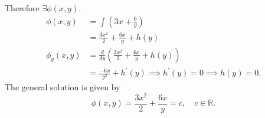 \documentclass[
	12pt,
	]{article}
\newcommand{\R}{\mathbb{R}}
\theoremstyle{definition}
\theoremstyle{definition}
\theoremstyle{definition}
\theoremstyle{definition}
\theoremstyle{definition}
\theoremstyle{example}
\theoremstyle{note}
\theoremstyle{remark}
\theoremstyle{example}
\begin{document}
			Therefore $\exists \phi(x,y)$. 
			\begin{align*}
				\phi(x,y) &= \int \left(3x + \frac{6}{y}\right) \\
				&= \frac{3x^{2}}{2} + \frac{6x}{y} + h(y) \\
				\phi_{y}(x,y) &= \frac{d}{dy} \left(\frac{3x^{2}}{2} + \frac{6x}{y} + h(y)\right) \\
				&= \frac{-6x}{y^{2}} + h^{\prime}(y) \implies h^{\prime}(y) = 0 \implies h(y) = 0. 
			\end{align*}
			The general solution is given by 
			\begin{equation*}
				\phi(x,y) = \frac{3x^{2}}{2} + \frac{6x}{y} =c, \quad c \in \R. 
			\end{equation*}
	
\end{document}
